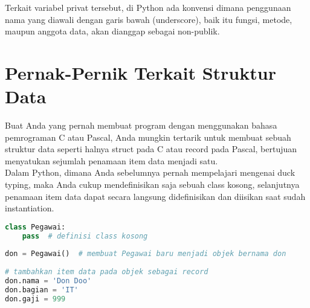 Terkait variabel privat tersebut, di Python ada konvensi dimana penggunaan nama yang diawali dengan garis bawah (underscore), baik itu fungsi, metode, maupun anggota data, akan dianggap sebagai non-publik.\\

\section{Pernak-Pernik Terkait Struktur Data}

Buat Anda yang pernah membuat program dengan menggunakan bahasa pemrograman C atau Pascal, Anda mungkin tertarik untuk membuat sebuah struktur data seperti halnya struct pada C atau record pada Pascal, bertujuan menyatukan sejumlah penamaan item data menjadi satu.\\

Dalam Python, dimana Anda sebelumnya pernah mempelajari mengenai duck typing, maka Anda cukup mendefinisikan saja sebuah class kosong, selanjutnya penamaan item data dapat secara langsung didefinisikan dan diisikan saat sudah instantiation.

\begin{lstlisting}[language=Python]
class Pegawai:
    pass  # definisi class kosong
 
don = Pegawai()  # membuat Pegawai baru menjadi objek bernama don
 
# tambahkan item data pada objek sebagai record
don.nama = 'Don Doo'
don.bagian = 'IT'
don.gaji = 999
\end{lstlisting}







